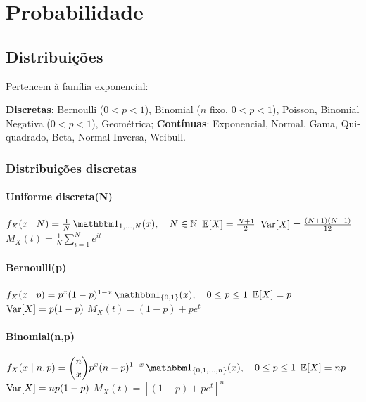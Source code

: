 
\chapter{Probabilidade}

\section{Distribuições}

\begin{theorem}
	Pertencem à família exponencial:
	\begin{outline}
		\1 \textbf{Discretas}: Bernoulli  ($0<p<1$), Binomial ($n$ fixo, $0<p<1$), Poisson, Binomial Negativa ($0<p<1$), Geométrica;
		\1 \textbf{Contínuas}: Exponencial, Normal, Gama, Qui-quadrado, Beta, Normal Inversa, Weibull.
	\end{outline}
\end{theorem}

\subsection{Distribuições discretas}

\subsubsection{Uniforme discreta(N)}
\begin{outline}
	\1 \( f_X(x \mid N) = \frac{1}{N} \ind_{1, \ldots, N}(x), \quad N \in \N \)
	\1 \( \operatorname{\mathbb{E}}[X] = \frac{N+1}{2} \)
	\1 \( \operatorname{Var}[X] = \frac{(N+1)(N-1)}{12} \)
	\1 \( M_X(t) = \frac{1}{N} \sum_{i=1}^{N}e^{it} \) 
\end{outline}

\subsubsection{Bernoulli(p)}
\begin{outline}
	\1 \( f_X(x \mid p) =p^x(1-p)^{1-x} \ind_{\{0,1\}}(x), \quad 0 \leq p \leq 1 \)
	\1 \( \operatorname{\mathbb{E}}[X] = p \)
	\1 \( \operatorname{Var}[X] = p(1-p) \)
	\1 \( M_X(t) = (1-p) + pe^t \) 
\end{outline}

\subsubsection{Binomial(n,p)}
\begin{outline}
	\1 \(\displaystyle f_X(x \mid n,p) =\binom{n}{x} p^x(n-p)^{1-x} \ind_{\{0,1,\ldots,n\}}(x), \quad 0 \leq p \leq 1 \)
	\1 \( \operatorname{\mathbb{E}}[X] = np \)
	\1 \( \operatorname{Var}[X] = np(1-p) \)
	\1 \( M_X(t) = \left[(1-p) + pe^t\right]^n \) 
\end{outline}

